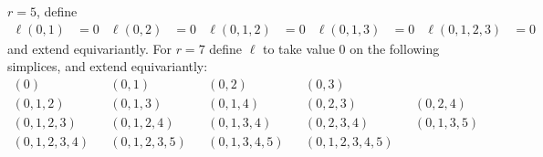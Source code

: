 \begin{lemma}
	\begin{example}
		$r=5$, define
		\begin{align*}
			\ell(0,1) &= 0 &
			\ell(0,2) &= 0 &
			\ell(0,1,2) &= 0 &
			\ell(0,1,3) &= 0 &
			\ell(0,1,2,3) &= 0
		\end{align*}
		and extend equivariantly. For $r=7$ define $\ell$ to take value $0$ on the following simplices, and extend equivariantly:
		\begin{align*}
			(0) &&
			(0,1) &&
			(0,2) &&
			(0,3) \\
			(0,1,2) &&
			(0,1,3) &&
			(0,1,4) &&
			(0,2,3) &&
			(0,2,4) \\
			(0,1,2,3) &&
			(0,1,2,4) &&
			(0,1,3,4) &&
			(0,2,3,4) &&
			(0,1,3,5) \\
			(0,1,2,3,4) &&
			(0,1,2,3,5) &&
			(0,1,3,4,5) &&
			(0,1,2,3,4,5)
		\end{align*}
	\end{example}

\end{lemma}

